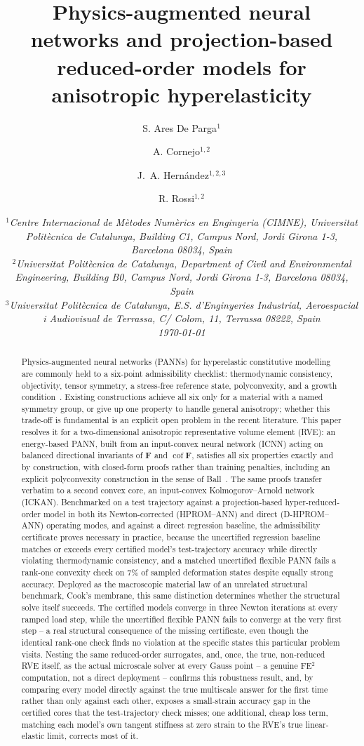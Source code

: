 \documentclass[10pt,a4paper]{article}
\title{Physics-augmented neural networks and projection-based reduced-order models for anisotropic hyperelasticity}
\author{
S. Ares De Parga$^{1}$ \and
A. Cornejo$^{1,2}$ \and
J.~A. Hern\'andez$^{1,2,3}$ \and
R. Rossi$^{1,2}$
}
\date{
\itshape
$^1$Centre Internacional de M\`{e}todes Num\`{e}rics en Enginyeria (CIMNE), Universitat
Polit\`{e}cnica de Catalunya, Building C1, Campus Nord, Jordi Girona 1-3,
Barcelona 08034, Spain\\
$^2$Universitat Polit\`{e}cnica de Catalunya, Department of Civil and
Environmental Engineering, Building B0, Campus Nord, Jordi Girona 1-3,
Barcelona 08034, Spain\\
$^3$Universitat Polit\`{e}cnica de Catalunya, E.S. d'Enginyeries Industrial,
Aeroespacial i Audiovisual de Terrassa, C/ Colom, 11, Terrassa 08222,
Spain\\[1em]
\upshape\today}
\newcommand{\Cof}{\operatorname{cof}}
\begin{document}
\maketitle

\begin{abstract}
Physics-augmented neural networks (PANNs) for hyperelastic constitutive
modelling are commonly held to a six-point admissibility checklist:
thermodynamic consistency, objectivity, tensor symmetry, a stress-free
reference state, polyconvexity, and a growth
condition~\cite{Klein2022,Ball1977}. Existing constructions achieve all
six only for a material with a named symmetry group, or give up one
property to handle general anisotropy; whether this trade-off is
fundamental is an explicit open problem in the recent literature. This
paper resolves it for a two-dimensional anisotropic representative
volume element (RVE): an energy-based PANN, built from an input-convex
neural network (ICNN) acting on balanced directional invariants of
$\bm F$ and $\Cof\bm F$, satisfies all six properties exactly and by
construction, with closed-form proofs rather than training penalties,
including an explicit polyconvexity construction in the sense of
Ball~\cite{Ball1977}. The same proofs transfer verbatim to a second
convex core, an input-convex Kolmogorov--Arnold network (ICKAN).
Benchmarked on a test trajectory against a projection-based
hyper-reduced-order model in both its Newton-corrected (HPROM--ANN) and
direct (D-HPROM--ANN) operating modes, and against a direct regression
baseline, the admissibility certificate proves necessary in practice,
because the uncertified regression baseline matches or exceeds every certified
model's test-trajectory accuracy while directly violating thermodynamic
consistency, and a matched uncertified flexible PANN fails a rank-one
convexity check on $7\%$ of sampled deformation states despite equally
strong accuracy. Deployed as the macroscopic material law of an
unrelated structural benchmark, Cook's membrane, this same distinction
determines whether the structural solve itself succeeds. The certified
models converge in three Newton iterations at every ramped load step,
while the uncertified flexible PANN fails to converge at the very first
step -- a real structural consequence of the missing certificate, even
though the identical rank-one check finds no violation at the specific
states this particular problem visits. Nesting the same reduced-order surrogates, and, once, the
true, non-reduced RVE itself, as the actual microscale solver at every
Gauss point -- a genuine FE$^2$ computation, not a direct deployment --
confirms this robustness result, and, by comparing every model directly
against the true multiscale answer for the first time rather than only
against each other, exposes a small-strain accuracy gap in the
certified cores that the test-trajectory check misses; one additional,
cheap loss term, matching each model's own tangent stiffness at zero
strain to the RVE's true linear-elastic limit, corrects most of it.
\end{abstract}
\end{document}
